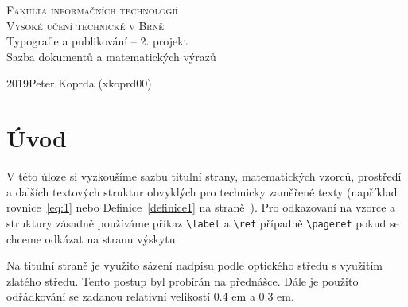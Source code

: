 \documentclass[11pt,a4paper,twocolumn]{article}
\theoremstyle{definition}
\begin{document}
\begin{titlepage}
    \begin{center}
    \huge\textsc{Fakulta informačních technologií\\Vysoké učení technické v Brně}\\
    \renewcommand{\baselinestretch}{0.4}
    \Large{Typografie a publikování \--- 2. projekt\\Sazba dokumentů a matematických výrazů}\\
    \renewcommand{\baselinestretch}{0.3}
    \end{center}
{\large 2019\hfill Peter Koprda (xkoprd00)}
\end{titlepage}

\newpage

\section*{Úvod}
    \label{sec:Úvod}
    V této úloze si vyzkoušíme sazbu titulní strany, matematických vzorců, prostředí a dalších textových struktur obvyklých pro technicky zaměřené texty (například rovnice~\eqref{eq:1} nebo Definice~\ref{definice1} na straně~\pageref{sec:Úvod}). Pro odkazovaní na vzorce a struktury zásadně používáme příkaz \verb|\label| a \verb|\ref| případně \verb!\pageref! pokud se chceme odkázat na stranu výskytu.\par
    Na titulní straně je využito sázení nadpisu podle optického středu s využitím zlatého středu. Tento postup byl probírán na přednášce. Dále je použito odřádkování se zadanou relativní velikostí 0.4 em a 0.3 em.
\end{document}
